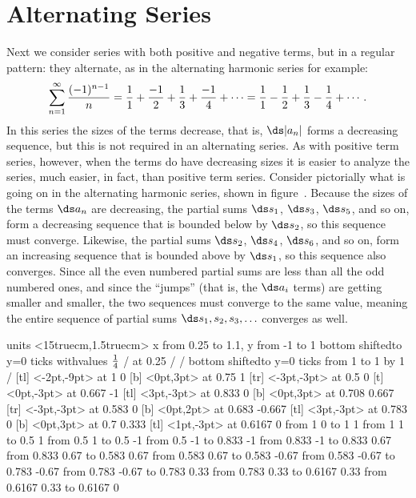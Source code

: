 \section{Alternating Series}{}{}
\nobreak
Next we consider series with both positive and negative terms, but in
a regular pattern: they alternate, as in the {\dfont alternating
  harmonic series%
%
\/} for example:
$$
  \sum_{n=1}^\infty {(-1)^{n-1}\over n}=
  {1\over1}+{-1\over2}+{1\over3}+{-1\over4}+\cdots=
  {1\over1}-{1\over2}+{1\over3}-{1\over4}+\cdots.
$$
In this series the sizes of the terms decrease, that is, 
$\ds |a_n|$ forms a decreasing sequence, but this is not required in an
alternating series. As with positive term series, however, when the
terms do have decreasing sizes it is easier to analyze the series,
much easier, in fact, than positive term series. Consider pictorially
what is going on in the alternating harmonic series, shown in
figure~. Because the sizes of
the terms $\ds a_n$ are decreasing, the partial sums $\ds s_1$, $\ds s_3$, $\ds s_5$,
and so on, form a decreasing sequence that is bounded below by
$\ds s_2$, so this sequence must converge.
Likewise, the partial sums $\ds s_2$, $\ds s_4$, $\ds s_6$,
and so on, form an increasing sequence that is bounded above by
$\ds s_1$, so this sequence also converges. Since all the even numbered
partial sums are less than all the odd numbered ones, and since the
``jumps'' (that is, the $\ds a_i$ terms) are getting smaller and smaller,
the two sequences must converge to the same value, meaning the entire
sequence of partial sums $\ds s_1,s_2,s_3,\ldots$ converges as well.

\figure
\vbox{\beginpicture
\normalgraphs
\ninepoint
\setcoordinatesystem units <15truecm,1.5truecm>
\setplotarea x from 0.25 to 1.1, y from -1 to 1
\axis bottom shiftedto y=0 ticks withvalues {$1\over4$} / at 0.25 / /
\axis bottom shiftedto y=0 ticks from 1 to 1 by 1 /
 [tl] <-2pt,-9pt> at 1 0
 [b] <0pt,3pt> at 0.75 1
 [tr] <-3pt,-3pt> at 0.5 0
 [t] <0pt,-3pt> at 0.667 -1
 [tl] <3pt,-3pt> at 0.833 0
 [b] <0pt,3pt> at 0.708 0.667
 [tr] <-3pt,-3pt> at 0.583 0
 [b] <0pt,2pt> at 0.683 -0.667
 [tl] <3pt,-3pt> at 0.783 0
 [b] <0pt,3pt> at 0.7 0.333
 [tl] <1pt,-3pt> at 0.6167 0
\putrule from 1 0 to 1 1
\arrow <4pt> [0.35, 1] from 1 1 to 0.5 1
\putrule from 0.5 1 to 0.5 -1
\arrow <4pt> [0.35, 1] from 0.5 -1 to 0.833 -1
\putrule from 0.833 -1 to 0.833 0.67
\arrow <4pt> [0.35, 1] from 0.833 0.67 to 0.583 0.67
\putrule from 0.583 0.67 to 0.583 -0.67
\arrow <4pt> [0.35, 1] from 0.583 -0.67 to 0.783 -0.67
\putrule from  0.783 -0.67 to  0.783 0.33
\arrow <4pt> [0.35, 1] from 0.783 0.33 to 0.6167 0.33
\putrule from  0.6167 0.33 to  0.6167 0
\endpicture}

